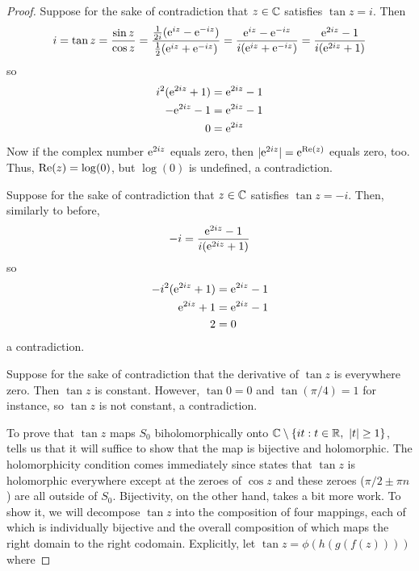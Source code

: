 \documentclass[../psets.tex]{subfiles}
\begin{document}
\begin{enumerate}[ref={A.\arabic*}]
\begin{proof}
        Suppose for the sake of contradiction that $z\in\C$ satisfies $\tan z=i$. Then
        \begin{equation*}
            i = \tan z
            = \frac{\sin z}{\cos z}
            = \frac{\frac{1}{2i}(\e[iz]-\e[-iz])}{\frac{1}{2}(\e[iz]+\e[-iz])}
            = \frac{\e[iz]-\e[-iz]}{i(\e[iz]+\e[-iz])}
            = \frac{\e[2iz]-1}{i(\e[2iz]+1)}
        \end{equation*}
        so
        \begin{align*}
            i^2(\e[2iz]+1) &= \e[2iz]-1\\
            -\e[2iz]-1 &= \e[2iz]-1\\
            0 &= \e[2iz]
        \end{align*}
        Now if the complex number $\e[2iz]$ equals zero, then $|\e[2iz]|=\e[\re(z)]$ equals zero, too. Thus, $\re(z)=\log(0)$, but $\log(0)$ is undefined, a contradiction.\par
        Suppose for the sake of contradiction that $z\in\C$ satisfies $\tan z=-i$. Then, similarly to before,
        \begin{equation*}
            -i = \frac{\e[2iz]-1}{i(\e[2iz]+1)}
        \end{equation*}
        so
        \begin{align*}
            -i^2(\e[2iz]+1) &= \e[2iz]-1\\
            \e[2iz]+1 &= \e[2iz]-1\\
            2 &= 0
        \end{align*}
        a contradiction.\par
        Suppose for the sake of contradiction that the derivative of $\tan z$ is everywhere zero. Then $\tan z$ is constant. However, $\tan 0=0$ and $\tan(\pi/4)=1$ for instance, so $\tan z$ is not constant, a contradiction.\par
        To prove that $\tan z$ maps $S_0$ biholomorphically onto $\C\setminus\{it:t\in\R,\ |t|\geq 1\}$, \textcite[6]{bib:FischerLieb} tells us that it will suffice to show that the map is bijective and holomorphic. The holomorphicity condition comes immediately since \textcite{bib:FischerLieb} states that $\tan z$ is holomorphic everywhere except at the zeroes of $\cos z$ and these zeroes ($\pi/2\pm \pi n$) are all outside of $S_0$. Bijectivity, on the other hand, takes a bit more work. To show it, we will decompose $\tan z$ into the composition of four mappings, each of which is individually bijective and the overall composition of which maps the right domain to the right codomain. Explicitly, let $\tan z=\phi(h(g(f(z))))$ where

\end{proof}
\end{enumerate}
\end{document}
